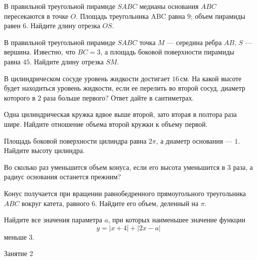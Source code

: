 \begin{class}[number=1]
\begin{listofex}
		\item В правильной треугольной пирамиде \( SABC \) медианы основания \( ABC \) пересекаются в точке \( O \). Площадь треугольника ABC равна \( 9 \); объем пирамиды равен \( 6 \). Найдите длину отрезка \( OS \).
		\item В правильной треугольной пирамиде \( SABC \) точка \( M \) --- середина ребра \( AB \), \( S \) --- вершина.
		Известно, что \( BC = 3 \), а площадь боковой поверхности пирамиды равна \( 45 \). Найдите длину отрезка \( SM \).
		\item В цилиндрическом сосуде уровень жидкости достигает \( 16 \) см. На какой высоте будет находиться уровень жидкости, если ее перелить во второй сосуд, диаметр которого в \( 2 \) раза больше первого? Ответ дайте в сантиметрах.
		\item Одна цилиндрическая кружка вдвое выше второй, зато вторая в полтора раза шире. Найдите отношение объема второй кружки к объему первой.
		\item Площадь боковой поверхности цилиндра равна \( 2 \pi \), а диаметр основания  --- \( 1 \). Найдите высоту цилиндра.
		\item Во сколько раз уменьшится объем конуса, если его высота уменьшится в \( 3 \) раза, а радиус основания останется прежним?
		\item Конус получается при вращении равнобедренного прямоугольного треугольника \( ABC \) вокруг катета, равного \( 6 \). Найдите его объем, деленный на \( \pi \).
		\item Найдите все значения параметра \( a \), при которых наименьшее значение функции
		\[ y=|x+4|+|2x-a| \]
		меньше \( 3 \).
	\end{listofex}
\end{class}

\begin{class}[number=2]
	\begin{listofex}
		\item Занятие 2
	\end{listofex}
\end{class}

